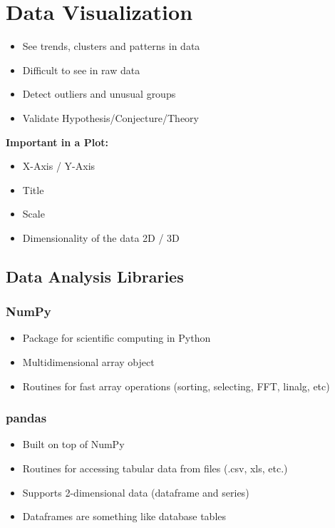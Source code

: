 \section{Data Visualization}
\begin{itemize}
    \item See trends, clusters and patterns in data
    \item Difficult to see in raw data
    \item Detect outliers and unusual groups
    \item Validate Hypothesis/Conjecture/Theory
\end{itemize}
\textbf{Important in a Plot:}
\begin{itemize}
    \item X-Axis / Y-Axis
    \item Title
    \item Scale
    \item Dimensionality of the data 2D / 3D
\end{itemize}

\subsection{Data Analysis Libraries}
\subsubsection{NumPy}
\begin{itemize}
    \item Package for scientific computing in Python
    \item Multidimensional array object
    \item Routines for fast array operations (sorting, selecting, FFT, linalg, etc)
\end{itemize}

\subsubsection{pandas}
\begin{itemize}
    \item Built on top of NumPy
    \item Routines for accessing tabular data from files (.csv, xls, etc.)
    \item Supports 2-dimensional data (dataframe and series)
    \item Dataframes are something like database tables
\end{itemize}

